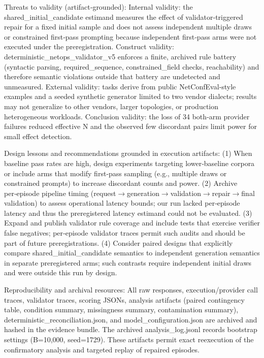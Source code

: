 \documentclass[conference]{IEEEtran}
\begin{document}
Threats to validity (artifact‑grounded): Internal validity: the shared\_initial\_candidate estimand measures the effect of validator‑triggered repair for a fixed initial sample and does not assess independent multiple draws or constrained first‑pass prompting because independent first‑pass arms were not executed under the preregistration. Construct validity: deterministic\_netops\_validator\_v5 enforces a finite, archived rule battery (syntactic parsing, required\_sequence, constrained\_field checks, reachability) and therefore semantic violations outside that battery are undetected and unmeasured. External validity: tasks derive from public NetConfEval‑style examples and a seeded synthetic generator limited to two vendor dialects; results may not generalize to other vendors, larger topologies, or production heterogeneous workloads. Conclusion validity: the loss of 34 both‑arm provider failures reduced effective N and the observed few discordant pairs limit power for small effect detection.

Design lessons and recommendations grounded in execution artifacts: (1) When baseline pass rates are high, design experiments targeting lower‑baseline corpora or include arms that modify first‑pass sampling (e.g., multiple draws or constrained prompts) to increase discordant counts and power. (2) Archive per‑episode pipeline timing (request\ensuremath{\rightarrow}generation\ensuremath{\rightarrow}validation\ensuremath{\rightarrow}repair\ensuremath{\rightarrow}final validation) to assess operational latency bounds; our run lacked per‑episode latency and thus the preregistered latency estimand could not be evaluated. (3) Expand and publish validator rule coverage and include tests that exercise verifier false negatives; per‑episode validator traces permit such audits and should be part of future preregistrations. (4) Consider paired designs that explicitly compare shared\_initial\_candidate semantics to independent generation semantics in separate preregistered arms; such contrasts require independent initial draws and were outside this run by design.

Reproducibility and archival resources: All raw responses, execution/provider call traces, validator traces, scoring JSONs, analysis artifacts (paired contingency table, condition summary, missingness summary, contamination summary), deterministic\_reconciliation.json, and model\_configuration.json are archived and hashed in the evidence bundle. The archived analysis\_log.jsonl records bootstrap settings (B=10,000, seed=1729). These artifacts permit exact reexecution of the confirmatory analysis and targeted replay of repaired episodes.
\end{document}
